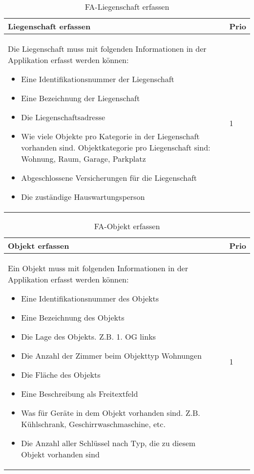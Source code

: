\begin{table}[H]
  \centering
  \settowidth{}
  \setlength\extrarowheight{2pt}
  \begin{tabulary}{1.0\textwidth}{|m{16cm}|L|}
    \hline
    \textbf{Liegenschaft erfassen}&\textbf{Prio}\\
    \hline
    Die Liegenschaft muss mit folgenden Informationen in der Applikation erfasst werden können:
    \begin{itemize}
      \item Eine Identifikationsnummer der Liegenschaft
      \item Eine Bezeichnung der Liegenschaft
      \item Die Liegenschaftsadresse
      \item Wie viele Objekte pro Kategorie in der Liegenschaft vorhanden sind. Objektkategorie pro Liegenschaft sind: Wohnung, Raum, Garage, Parkplatz
      \item Abgeschlossene Versicherungen für die Liegenschaft
      \item Die zuständige Hauswartungsperson
    \end{itemize} & 1\\ 
    \hline
  \end{tabulary}
  \caption{FA-Liegenschaft erfassen}
  \label{faLiegenschaftErfassen}
\end{table}

\begin{table}[H]
  \centering
  \settowidth{}
  \setlength\extrarowheight{2pt}
  \begin{tabulary}{1.0\textwidth}{|m{16cm}|L|}
    \hline
    \textbf{Objekt erfassen}&\textbf{Prio}\\
    \hline
    Ein Objekt muss mit folgenden Informationen in der Applikation erfasst werden können:
    \begin{itemize}
      \item Eine Identifikationsnummer des Objekts
      \item Eine Bezeichnung des Objekts
      \item Die Lage des Objekts. Z.B. 1. OG links
      \item Die Anzahl der Zimmer beim Objekttyp Wohnungen
      \item Die Fläche des Objekts
      \item Eine Beschreibung als Freitextfeld
      \item Was für Geräte in dem Objekt vorhanden sind. Z.B. Kühlschrank, Geschirrwaschmaschine, etc.
      \item Die Anzahl aller Schlüssel nach Typ, die zu diesem Objekt vorhanden sind 
    \end{itemize} & 1\\ 
    \hline
  \end{tabulary}
  \caption{FA-Objekt erfassen}
  \label{faObjektErfassen}
\end{table}

